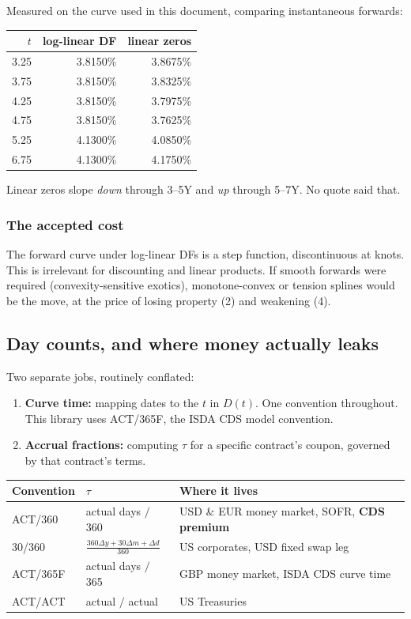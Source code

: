 \documentclass[11pt,a4paper]{article}
\begin{document}
Measured on the curve used in this document, comparing instantaneous forwards:

\begin{center}
\begin{tabular}{rrr}
\toprule
$t$ & log-linear DF & linear zeros \\
\midrule
3.25 & 3.8150\% & 3.8675\% \\
3.75 & 3.8150\% & 3.8325\% \\
4.25 & 3.8150\% & 3.7975\% \\
4.75 & 3.8150\% & 3.7625\% \\
5.25 & 4.1300\% & 4.0850\% \\
6.75 & 4.1300\% & 4.1750\% \\
\bottomrule
\end{tabular}
\end{center}

Linear zeros slope \emph{down} through 3--5Y and \emph{up} through 5--7Y. No quote said that.

\subsubsection*{The accepted cost}

The forward curve under log-linear DFs is a step function, discontinuous at knots. This is
irrelevant for discounting and linear products. If smooth forwards were required
(convexity-sensitive exotics), monotone-convex or tension splines would be the move, at the
price of losing property (2) and weakening (4).

\subsection{Day counts, and where money actually leaks}

Two separate jobs, routinely conflated:

\begin{enumerate}[leftmargin=1.4em]
\item \textbf{Curve time:} mapping dates to the $t$ in $D(t)$. One convention throughout.
This library uses ACT/365F, the ISDA CDS model convention.
\item \textbf{Accrual fractions:} computing $\tau$ for a specific contract's coupon,
governed by that contract's terms.
\end{enumerate}

\begin{center}
\begin{tabular}{lll}
\toprule
\textbf{Convention} & \textbf{$\tau$} & \textbf{Where it lives} \\
\midrule
ACT/360  & actual days $/$ 360 & USD \& EUR money market, SOFR, \textbf{CDS premium} \\
30/360   & $\frac{360\Delta y + 30\Delta m + \Delta d}{360}$ & US corporates, USD fixed swap leg \\
ACT/365F & actual days $/$ 365 & GBP money market, ISDA CDS curve time \\
ACT/ACT  & actual $/$ actual   & US Treasuries \\
\bottomrule
\end{tabular}
\end{center}
\end{document}
